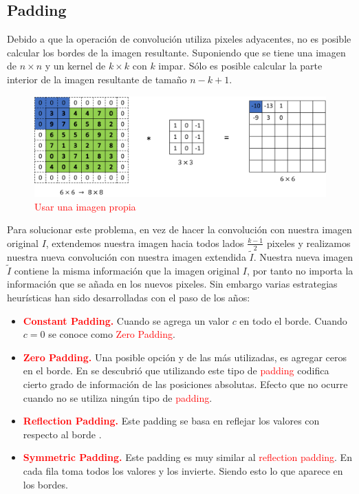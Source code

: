  \subsection{Padding}
 Debido a que la operación de convolución utiliza  pixeles adyacentes, no es posible calcular los bordes de la imagen resultante. Suponiendo que se tiene una imagen de $n\times n$ y un kernel de $k\times k$ con $k$ impar. Sólo es posible calcular la parte interior de la imagen resultante de tamaño $n-k+1$.
 \begin{figure}[H]
    \centering
     \includegraphics[width = 5in]{../cap2_CNNs/src/padding.png}
     \caption{\textcolor{red}{Usar una imagen propia}}
 \end{figure} 
 Para solucionar este problema, en vez de hacer la convolución con nuestra imagen original $I$, extendemos nuestra imagen hacia todos lados $\frac{k-1}{2}$ pixeles y realizamos nuestra nueva convolución con nuestra imagen extendida $\tilde I$.
 Nuestra nueva imagen $\tilde I$ contiene la misma información que la imagen original $I$, por tanto no importa la información que se añada en los nuevos pixeles. Sin embargo varias estrategias heurísticas han sido desarrolladas con el paso de los años:
\begin{itemize}
    \item \textcolor{red}{\textbf{Constant Padding.}} Cuando  se agrega un valor $c$ en todo el borde. Cuando $c = 0$ se conoce como \textcolor{red}{Zero Padding}.
    \item \textcolor{red}{\textbf{Zero Padding.}} Una posible opción y de las más utilizadas, es agregar ceros en el borde. En \cite{padding} se descubrió que utilizando este tipo de \textcolor{red}{padding} codifica cierto grado de información de las posiciones absolutas. Efecto que no ocurre cuando no se utiliza ningún tipo de \textcolor{red}{padding}. 
    \item \textcolor{red}{\textbf{Reflection Padding.}} Este padding se basa en reflejar los valores con respecto al borde \cite{type_of_paddings}.
    \item \textcolor{red}{\textbf{Symmetric Padding.}} Este padding es muy similar al \textcolor{red}{reflection padding}. En cada fila toma todos los valores y los invierte. Siendo esto lo que aparece en los bordes.
\end{itemize}
